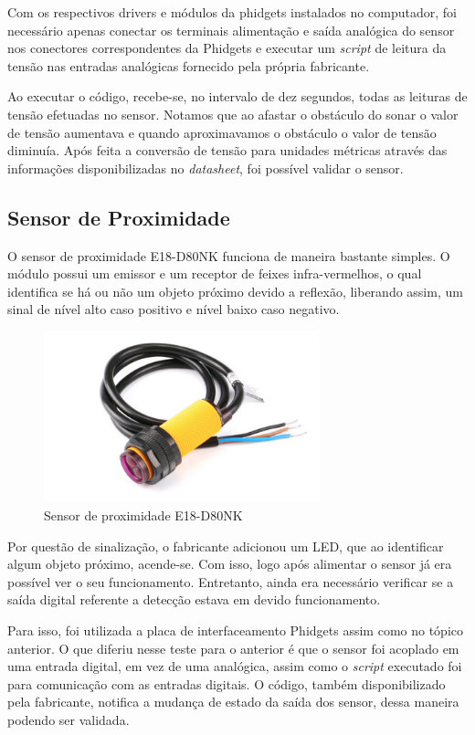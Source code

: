 		Com os respectivos drivers e módulos da phidgets instalados no computador, foi necessário apenas conectar os terminais alimentação e saída analógica do sensor nos conectores correspondentes da Phidgets e executar um \textit{script} de leitura da tensão nas entradas analógicas fornecido pela própria fabricante. 
		
		Ao executar o código, recebe-se, no intervalo de dez segundos, todas as leituras de tensão efetuadas no sensor. Notamos que ao afastar o obstáculo do sonar o valor de tensão aumentava e quando aproximavamos o obstáculo o valor de tensão diminuía. Após feita a conversão de tensão para unidades métricas através das informações disponibilizadas no \textit{datasheet}, foi possível validar o sensor.
	
	\subsection{Sensor de Proximidade}
		O sensor de proximidade E18-D80NK funciona de maneira bastante simples. O módulo possui um emissor e um receptor de feixes infra-vermelhos, o qual identifica se há ou não um objeto próximo devido a reflexão, liberando assim, um sinal de nível alto caso positivo e nível baixo caso negativo.
		
		\begin{figure}[!ht]
		   \centering
		   \includegraphics[width=8cm]{Figures/proximity_sensor.jpg}
		   \caption{Sensor de proximidade E18-D80NK}
		   \label{fig:E18-D80NK}
		\end{figure}
		
		Por questão de sinalização, o fabricante adicionou um LED, que ao identificar algum objeto próximo, acende-se. Com isso, logo após alimentar o sensor já era possível ver o seu funcionamento. Entretanto, ainda era necessário verificar se a saída digital referente a detecção estava em devido funcionamento.
		
		Para isso, foi utilizada a placa de interfaceamento Phidgets assim como no tópico anterior. O que diferiu nesse teste para o anterior é que o sensor foi acoplado em uma entrada digital, em vez de uma analógica, assim como o \textit{script} executado foi para comunicação com as entradas digitais. O código, também disponibilizado pela fabricante, notifica a mudança de estado da saída dos sensor, dessa maneira podendo ser validada.
		

